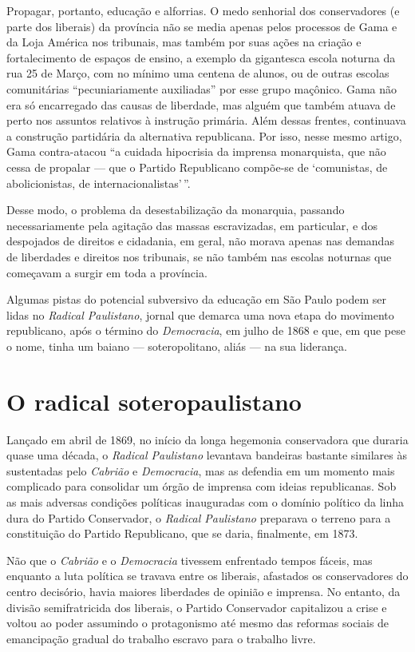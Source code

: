 Propagar, portanto, educação e alforrias. O medo senhorial dos
conservadores (e parte dos liberais) da província não se media apenas
pelos processos de Gama e da Loja América nos tribunais, mas também por
suas ações na criação e fortalecimento de espaços de ensino, a exemplo
da gigantesca escola noturna da rua 25 de Março, com no mínimo uma
centena de alunos, ou de outras escolas comunitárias ``pecuniariamente
auxiliadas'' por esse grupo maçônico. Gama não era só encarregado das
causas de liberdade, mas alguém que também atuava de perto nos assuntos
relativos à instrução primária. Além dessas frentes, continuava a
construção partidária da alternativa republicana. Por isso, nesse mesmo
artigo, Gama contra-atacou ``a cuidada hipocrisia da imprensa
monarquista, que não cessa de propalar --- que o Partido Republicano
compõe-se de `comunistas, de abolicionistas, de internacionalistas'\,''.

Desse modo, o problema da desestabilização da monarquia, passando
necessariamente pela agitação das massas escravizadas, em particular, e
dos despojados de direitos e cidadania, em geral, não morava apenas nas
demandas de liberdades e direitos nos tribunais, se não também nas
escolas noturnas que começavam a surgir em toda a província.

Algumas pistas do potencial subversivo da educação em São Paulo podem
ser lidas no \emph{Radical Paulistano}, jornal que demarca uma nova
etapa do movimento republicano, após o término do \emph{Democracia}, em
julho de 1868 e que, em que pese o nome, tinha um baiano ---
soteropolitano, aliás --- na sua liderança.

\section{O radical soteropaulistano}

Lançado em abril de 1869, no início da longa hegemonia conservadora que
duraria quase uma década, o \emph{Radical Paulistano} levantava
bandeiras bastante similares às sustentadas pelo \emph{Cabrião} e
\emph{Democracia}, mas as defendia em um momento mais complicado para
consolidar um órgão de imprensa com ideias republicanas. Sob as mais
adversas condições políticas inauguradas com o domínio político da linha
dura do Partido Conservador, o \emph{Radical Paulistano} preparava o
terreno para a constituição do Partido Republicano, que se daria,
finalmente, em 1873.

Não que o \emph{Cabrião} e o \emph{Democracia} tivessem enfrentado
tempos fáceis, mas enquanto a luta política se travava entre os
liberais, afastados os conservadores do centro decisório, havia maiores
liberdades de opinião e imprensa. No entanto, da divisão semifratricida
dos liberais, o Partido Conservador capitalizou a crise e voltou ao
poder assumindo o protagonismo até mesmo das reformas sociais de
emancipação gradual do trabalho escravo para o trabalho livre.


